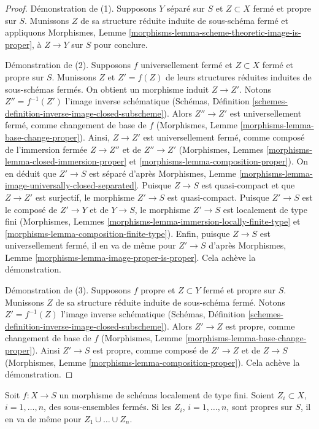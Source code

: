 \begin{proof}
Démonstration de (1). Supposons $Y$ séparé sur $S$ et $Z \subset X$
fermé et propre sur $S$. Munissons $Z$ de sa structure réduite induite
de sous-schéma fermé et appliquons
Morphismes, Lemme \ref{morphisms-lemma-scheme-theoretic-image-is-proper},
à $Z \to Y$ sur $S$ pour conclure.

\medskip\noindent
Démonstration de (2). Supposons $f$ universellement fermé et $Z \subset X$
fermé et propre sur $S$. Munissons $Z$ et $Z' = f(Z)$ de leurs structures réduites
induites de sous-schémas fermés. On obtient un
morphisme induit $Z \to Z'$.
Notons $Z'' = f^{-1}(Z')$ l'image inverse schématique
(Schémas, Définition \ref{schemes-definition-inverse-image-closed-subscheme}).
Alors $Z'' \to Z'$ est universellement fermé, comme changement de base de $f$
(Morphismes, Lemme \ref{morphisms-lemma-base-change-proper}).
Ainsi, $Z \to Z'$ est universellement fermé, comme composé de
l'immersion fermée $Z \to Z''$ et de $Z'' \to Z'$
(Morphismes, Lemmes
\ref{morphisms-lemma-closed-immersion-proper} et
\ref{morphisms-lemma-composition-proper}).
On en déduit que $Z' \to S$ est séparé d'après
Morphismes, Lemme \ref{morphisms-lemma-image-universally-closed-separated}.
Puisque $Z \to S$ est quasi-compact et que $Z \to Z'$ est surjectif,
le morphisme $Z' \to S$ est quasi-compact.
Puisque $Z' \to S$ est le composé de $Z' \to Y$ et de $Y \to S$,
le morphisme $Z' \to S$ est localement de type fini
(Morphismes, Lemmes \ref{morphisms-lemma-immersion-locally-finite-type} et
\ref{morphisms-lemma-composition-finite-type}).
Enfin, puisque $Z \to S$ est universellement fermé,
il en va de même pour $Z' \to S$ d'après
Morphismes, Lemme \ref{morphisms-lemma-image-proper-is-proper}.
Cela achève la démonstration.

\medskip\noindent
Démonstration de (3). Supposons $f$ propre et $Z \subset Y$ fermé et
propre sur $S$. Munissons $Z$ de sa structure réduite induite de sous-schéma
fermé. Notons $Z' = f^{-1}(Z)$ l'image inverse schématique
(Schémas, Définition \ref{schemes-definition-inverse-image-closed-subscheme}).
Alors $Z' \to Z$ est propre, comme changement de base de $f$
(Morphismes, Lemme \ref{morphisms-lemma-base-change-proper}).
Ainsi $Z' \to S$ est propre, comme composé de $Z' \to Z$
et de $Z \to S$
(Morphismes, Lemme \ref{morphisms-lemma-composition-proper}).
Cela achève la démonstration.
\end{proof}

\begin{lemma}
\label{lemma-union-closed-proper-over-base}
Soit $f : X \to S$ un morphisme de schémas localement de type fini.
Soient $Z_i \subset X$, $i = 1, \ldots, n$, des sous-ensembles fermés.
Si les $Z_i$, $i = 1, \ldots, n$, sont propres sur $S$, il en va
de même pour $Z_1 \cup \ldots \cup Z_n$.
\end{lemma}

